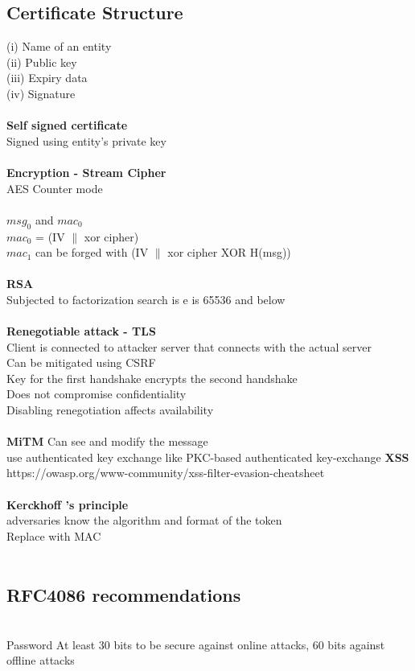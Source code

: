 \documentclass[11pt]{article}
\begin{document}
\begin{multicols*}{3}
\subsection*{Certificate Structure}
(i) Name of an entity \\
(ii) Public key \\
(iii) Expiry data \\
(iv) Signature\\\\
\textbf{Self signed certificate}\\
Signed using entity's private key\\\\
\textbf{Encryption - Stream Cipher}\\
AES Counter mode\\\\
$msg_{0}$ and $mac_{0}$ \\
$ mac_{0}$ = (IV $\|$ xor cipher)\\
$mac_{1}$ can be forged with (IV $\|$ xor cipher XOR H(msg))\\\\
\textbf{RSA}\\
Subjected to factorization search is e is  65536 and below\\\\
\textbf{Renegotiable attack - TLS}\\
Client is connected to attacker server that connects with the actual server\\
Can be mitigated using CSRF\\
Key for the first handshake encrypts the second handshake\\
Does not compromise confidentiality\\
Disabling renegotiation affects availability
\\\\
\textbf{MiTM}
Can see and modify the message\\
use authenticated key exchange like PKC-based authenticated key-exchange
\textbf{XSS}\\
\textcolor{link}{https://owasp.org/www-community/xss-filter-evasion-cheatsheet}\\\\
\textbf{Kerckhoff  ’s principle}\\
adversaries know the
algorithm and format of the token\\
Replace with MAC
\\\\
\subsection*{RFC4086 recommendations}\\
Password At least 30 bits to be secure against online attacks, 60 bits against offline attacks \\

\end{multicols*}
\end{document}
